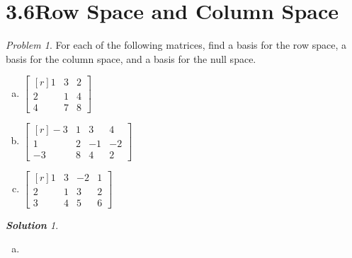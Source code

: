 \documentclass[12pt, letterpaper]{article}
\theoremstyle{remark}
\newtheorem{problem}{Problem}
\theoremstyle{remark}
\newtheorem*{solution}{\textbf{Solution}}
\begin{document}
        \section*{3.6\quad{}Row Space and Column Space}
        
        \begin{problem} 
            
            For each of the following matrices, find a basis 
            for the row space, a basis for the column space, 
            and a basis for the null space.
            \begin{enumerate}[(a)]
                
                \item \(
                    \begin{bmatrix*}[r]
                        1 & 3 & 2 \\
                        2 & 1 & 4 \\
                        4 & 7 & 8
                    \end{bmatrix*} 
                    \)
    
                \item \(
                    \begin{bmatrix*}[r]
                        −3 & 1 & 3 & 4 \\
                         1 & 2 & −1 & −2 \\
                        −3 & 8 & 4 & 2
                    \end{bmatrix*}
                    \)
                
                \item \(
                    \begin{bmatrix*}[r]
                        1 & 3 & −2 & 1 \\
                        2 & 1 & 3 & 2 \\
                        3 & 4 & 5 & 6
                    \end{bmatrix*}
                    \)
    
            \end{enumerate}
        
        \end{problem}
    
        \begin{solution}
            
            \begin{enumerate}[(a)]
                \item
            \end{enumerate}
    
        \end{solution}
    
\end{document}
